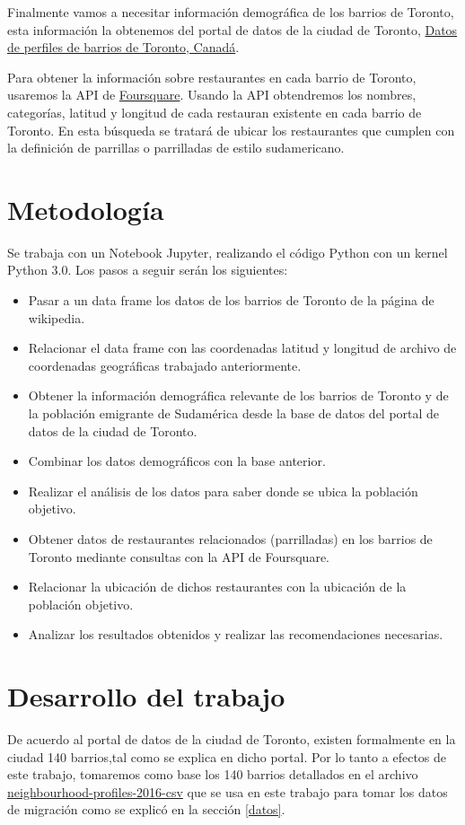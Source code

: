 \documentclass[10pt,a4paper,arial, spanish]{article}
\begin{document}
Finalmente vamos a necesitar información demográfica de los barrios de Toronto, esta información la obtenemos del portal de datos de la ciudad de Toronto, {\href{https://open.toronto.ca/dataset/neighbourhood-profiles/}{Datos de perfiles de barrios de Toronto, Canadá}}.

Para obtener la información sobre restaurantes en cada barrio de Toronto, usaremos la API de  {\href{https://developer.foursquare.com/docs}{Foursquare}}. Usando la API obtendremos los nombres, categorías, latitud y longitud de cada restauran existente en cada barrio de Toronto. En esta búsqueda se tratará de ubicar los restaurantes que cumplen con la definición de parrillas o parrilladas de estilo sudamericano.   

\section{Metodología}
Se trabaja con un Notebook Jupyter, realizando el código Python con un kernel Python 3.0.
Los pasos a seguir serán los siguientes:
\begin{itemize}
	\item Pasar a un data frame los datos de los barrios de Toronto de la página de wikipedia.
	\item Relacionar el data frame con las coordenadas latitud y longitud de archivo de coordenadas geográficas trabajado anteriormente.
	\item Obtener la información demográfica relevante de los barrios de Toronto y de la población emigrante de Sudamérica  desde  la base de datos del portal de datos de la ciudad de Toronto.
	\item Combinar los datos demográficos con la base anterior.
	\item Realizar el análisis de los datos para saber donde se ubica la población objetivo.
	\item Obtener datos de restaurantes relacionados (parrilladas) en los barrios de Toronto mediante consultas con la API de Foursquare.
	\item Relacionar la ubicación de dichos restaurantes con la ubicación de la población objetivo.
	\item Analizar los resultados obtenidos y realizar las recomendaciones necesarias.   
\end{itemize}

\section{Desarrollo del trabajo}
De acuerdo al portal de datos de la ciudad de Toronto, existen formalmente en la ciudad 140 barrios,tal como se explica en dicho portal.
Por lo tanto a efectos de este trabajo, tomaremos como base los 140 barrios detallados en el archivo {\href{https://ckan0.cf.opendata.inter.prod-toronto.ca/download_resource/ef0239b1-832b-4d0b-a1f3-4153e53b189e?format=csv}{neighbourhood-profiles-2016-csv}}  que se usa en este trabajo para tomar los datos de migración como se explicó en la sección \ref{datos}.
\end{document}
